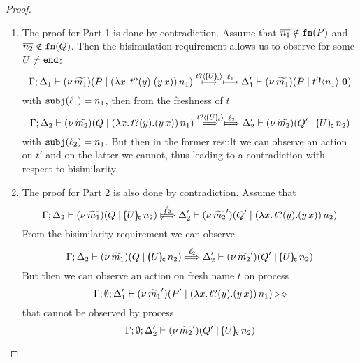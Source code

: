 \begin{lemma}
\begin{enumerate}
	\end{enumerate}
\end{lemma}

\begin{proof}
	\begin{enumerate}
		\item	The proof for Part 1 is done by contradiction.
				Assume that $\overline{n_1} \notin \mathtt{fn}(P)$ and $\overline{n_2} \notin \mathtt{fn}(Q)$.
				Then the bisimulation requirement allows us to observe for some $U \not= \mathtt{end}$:
				\[
					\Gamma; \Delta_1 \vdash (\nu\, \widetilde{m_1})(P \;|\; (\lambda x.\,t ? (y) . (y\, {x}))\, {n_1} )  \stackrel{ t ? \langle [\!\!(U)\!\!]_{\mathsf{c}} \rangle  }{\longmapsto} \stackrel{\ell_1}{\longmapsto}  \Delta_1' \vdash (\nu\, \widetilde{m_1})(P \;|\; t' ! \langle n_1 \rangle . \mathbf{0} )
				\]
				with $\mathtt{subj}(\ell_1) = n_1$, then from the freshness of $t$
				\[
					\horel{\Gamma}{\Delta_2}{\newsp{\widetilde{m_2}}{Q \Par \appl{(\trvalx{t})}{n_1} }}
					{ \Hby{ \bactinp{t}{\omapchar{U}}  } \Hby{\ell_2} }
					{\Delta_2'}{\newsp{\widetilde{m_2}}{Q' \Par \appl{\omapchar{U}}{n_2}}}
				\]
				with $\mathtt{subj}(\ell_2) = n_1$.
				But then in the former result we can observe an action on $t'$ and on the latter
				we cannot, thus leading to a contradiction with respect to bisimilarity.

		\item	The proof for Part 2 is also done by contradiction. Assume that
				\[
					\horel{\Gamma}{\Delta_2}{\newsp{\widetilde{m_1}}{Q \Par \appl{\omapchar{U}}{n_2} }} %
					{\not\Hby{\hat{\ell_2}}}
					{\Delta_2'}{\newsp{\widetilde{m_2}'}{Q' \Par \appl{(\trvalx{t})}{n_2} }} %
				\]
				From the bisimilarity requirement we can observe
				\[
					\horel{\Gamma}{\Delta_2}{\newsp{\widetilde{m_1}}{Q \Par \appl{\omapchar{U}}{n_2} }} %
					{\Hby{\hat{\ell_2}}}
					{\Delta_2'}{\newsp{\widetilde{m_2}'}{Q' \Par \appl{\omapchar{U}}{n_2} }} %
				\]
				But then we can observe an action on fresh name $t$ on process
				\[
					\Gamma; \emptyset; \Delta_1' \vdash (\nu\, \widetilde{m_1}')(P' \;|\; (\lambda x.\,t ? (y) . (y\, {x}))\, {n_1} ) \triangleright \diamond
				\]
				that cannot be observed by process
				\[
					\Gamma; \emptyset; \Delta_2' \vdash (\nu\, \widetilde{m_2}')(Q' \;|\; [\!\!(U)\!\!]_{\mathsf{c}}\, {n_2} )
				\]


\end{enumerate}
\end{proof}
